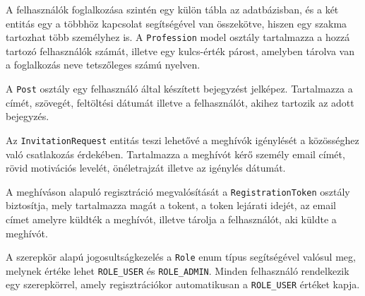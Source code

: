 A felhasználók foglalkozása szintén egy külön tábla az adatbázisban, és a két entitás egy a többhöz kapcsolat segítségével van összekötve, hiszen egy szakma tartozhat több személyhez is. A \texttt{Profession} model osztály tartalmazza a hozzá tartozó felhasználók számát, illetve egy kulcs-érték párost, amelyben tárolva van a foglalkozás neve tetszőleges számú nyelven.

A \texttt{Post} osztály egy felhasználó által készített bejegyzést jelképez. Tartalmazza a címét, szövegét, feltöltési dátumát illetve a felhasználót, akihez tartozik az adott bejegyzés.

Az \texttt{InvitationRequest} entitás teszi lehetővé a meghívók igénylését a közösséghez való csatlakozás érdekében. Tartalmazza  a meghívót kérő személy email címét, rövid motivációs levelét, önéletrajzát illetve az igénylés dátumát. 

A meghíváson alapuló regisztráció megvalósítását a \texttt{RegistrationToken} osztály biztosítja, mely tartalmazza magát a tokent, a token lejárati idejét, az email címet amelyre küldték a meghívót, illetve tárolja a felhasználót, aki küldte a meghívót. 

A szerepkör alapú jogosultságkezelés a \texttt{Role} enum típus segítségével valósul meg, melynek értéke lehet \texttt{ROLE\_USER} és \texttt{ROLE\_ADMIN}. Minden felhasználó rendelkezik egy szerepkörrel, amely regisztrációkor automatikusan a \texttt{ROLE\_USER} értéket kapja. 

